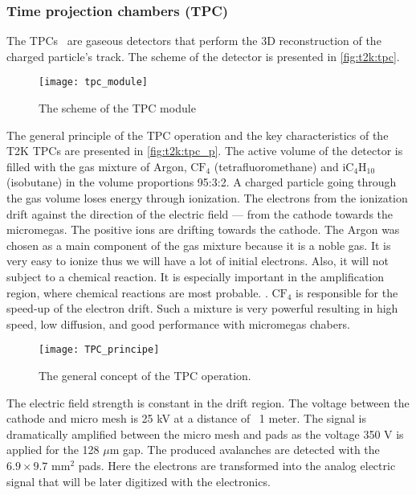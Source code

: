 \documentclass[../main.tex]{subfiles}
\begin{document}
\subsubsection{Time projection chambers (TPC)}
The TPCs~\cite{Abgrall2011} are gaseous detectors that perform the 3D reconstruction of the charged particle's track. The scheme of the detector is presented in \autoref{fig:t2k:tpc}.

\begin{figure}[!ht]
  \centering
  \texttt{[image: tpc\_module]}
  \caption{The scheme of the TPC module}
  \label{fig:t2k:tpc}
\end{figure}

The general principle of the TPC operation and the key characteristics of the T2K TPCs are presented in \autoref{fig:t2k:tpc_p}. The active volume of the detector is filled with the gas mixture of Argon, $\text{CF}_4$ (tetrafluoromethane) and $\text{iC}_4\text{H}_{10}$ (isobutane) in the volume proportions 95:3:2. A charged particle going through the gas volume loses energy through ionization. The electrons from the ionization drift against the direction of the electric field --- from the cathode towards the micromegas. The positive ions are drifting towards the cathode. The Argon was chosen as a main component of the gas mixture because it is a noble gas. It is very easy to ionize thus we will have a lot of initial electrons. Also, it will not subject to a chemical reaction. It is especially important in the amplification region, where chemical reactions are most probable. . $\text{CF}_4$ is responsible for the speed-up of the electron drift. Such a mixture is very powerful resulting in high speed, low diffusion, and good performance with micromegas chabers.

\begin{figure}[!ht]
  \centering
  \texttt{[image: TPC\_principe]}
  \caption{The general concept of the TPC operation.}
  \label{fig:t2k:tpc_p}
\end{figure}

The electric field strength is constant in the drift region. The voltage between the cathode and micro mesh is 25 kV at a distance of ~1 meter. The signal is dramatically amplified between the micro mesh and pads as the voltage 350 V is applied for the 128 $\mu \text{m}$ gap. The produced avalanches are detected with the $6.9\times9.7$ $\text{mm}^2$ pads. Here the electrons are transformed into the analog electric signal that will be later digitized with the electronics.
\end{document}
